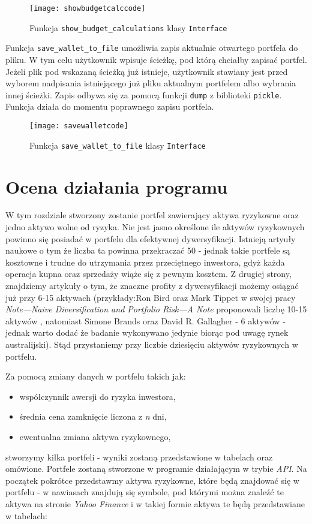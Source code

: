 \documentclass[magister]{dyplom}
\def\code#1{\texttt{#1}}
\begin{document}
\begin{figure}[h]
	\centering
	\texttt{[image: showbudgetcalccode]}
	\caption{Funkcja \code{show\_budget\_calculations} klasy \code{Interface}}
\end{figure}

\newpage
Funkcja \code{save\_wallet\_to\_file} umożliwia zapis aktualnie otwartego portfela do pliku. W tym celu użytkownik wpisuje ścieżkę, pod którą chciałby zapisać portfel. Jeżeli plik pod wskazaną ścieżką już istnieje, użytkownik stawiany jest przed wyborem nadpisania istniejącego już pliku aktualnym portfelem albo wybrania innej ścieżki. Zapis odbywa się za pomocą funkcji \code{dump} z biblioteki \code{pickle}. Funkcja działa do momentu poprawnego zapisu portfela.

\begin{figure}[h]
	\centering
	\texttt{[image: savewalletcode]}
	\caption{Funkcja \code{save\_wallet\_to\_file} klasy \code{Interface}}
\end{figure}
\chapter{Ocena działania programu}

W tym rozdziale stworzony zostanie portfel zawierający aktywa ryzykowne oraz jedno aktywo wolne od ryzyka. Nie jest jasno określone ile aktywów ryzykownych powinno się posiadać w portfelu dla efektywnej dywersyfikacji. Istnieją artyuły naukowe o tym że liczba ta powinna przekraczać 50 - jednak takie portfele są kosztowne i trudne do utrzymania przez przeciętnego inwestora, gdyż każda operacja kupna oraz sprzedaży wiąże się z pewnym kosztem. Z drugiej strony, znajdziemy artykuły o tym, że znaczne profity z dywersyfikacji możemy osiągać już przy 6-15 aktywach (przykłady:Ron Bird oraz Mark Tippet w swojej pracy \textit{Note---Naive Diversification and Portfolio Risk---A Note} proponowali liczbę 10-15 aktywów \cite{birdtippett}, natomiast Simone Brands oraz David R. Gallagher - 6 aktywów - jednak warto dodać że badanie wykonywano jedynie biorąc pod uwagę rynek australijski\cite{brandsgallagher})\cite{howmanystocks}. Stąd przystaniemy przy liczbie dziesięciu aktywów ryzykownych w portfelu.

Za pomocą zmiany danych w portfelu takich jak:

\begin{itemize}
	\item współczynnik awersji do ryzyka inwestora,
	\item średnia cena zamknięcie liczona z \textit{n} dni,
	\item ewentualna zmiana aktywa ryzykownego,
\end{itemize}
stworzymy kilka portfeli - wyniki zostaną przedstawione w tabelach oraz omówione. Portfele zostaną stworzone w programie działającym w trybie \textit{API}.
Na początek pokrótce przedstawmy aktywa ryzykowne, które będą znajdować się w portfelu - w nawiasach znajdują się symbole, pod którymi można znaleźć te aktywa na stronie \textit{Yahoo Finance} i w takiej formie aktywa te będą przedstawiane w tabelach:
\end{document}

